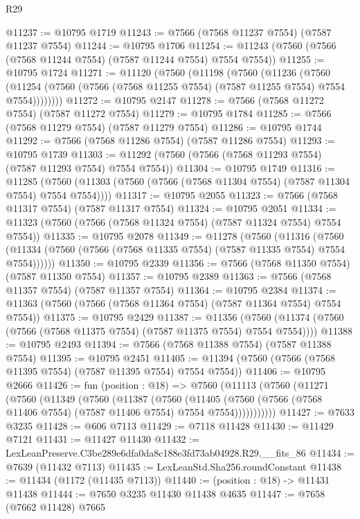 \begin{lexlean}{R29}
\begin{coremodule}
@11237 := @10795 @1719
@11243 := @7566 (@7568 @11237 @7554) (@7587 @11237 @7554)
@11244 := @10795 @1706
@11254 := @11243 (@7560 (@7566 (@7568 @11244 @7554) (@7587 @11244 @7554) @7554 @7554))
@11255 := @10795 @1724
@11271 := @11120
    (@7560
      (@11198
        (@7560
          (@11236
            (@7560
              (@11254 (@7560 (@7566 (@7568 @11255 @7554) (@7587 @11255 @7554) @7554 @7554))))))))
@11272 := @10795 @2147
@11278 := @7566 (@7568 @11272 @7554) (@7587 @11272 @7554)
@11279 := @10795 @1784
@11285 := @7566 (@7568 @11279 @7554) (@7587 @11279 @7554)
@11286 := @10795 @1744
@11292 := @7566 (@7568 @11286 @7554) (@7587 @11286 @7554)
@11293 := @10795 @1739
@11303 := @11292 (@7560 (@7566 (@7568 @11293 @7554) (@7587 @11293 @7554) @7554 @7554))
@11304 := @10795 @1749
@11316 := @11285
    (@7560 (@11303 (@7560 (@7566 (@7568 @11304 @7554) (@7587 @11304 @7554) @7554 @7554))))
@11317 := @10795 @2055
@11323 := @7566 (@7568 @11317 @7554) (@7587 @11317 @7554)
@11324 := @10795 @2051
@11334 := @11323 (@7560 (@7566 (@7568 @11324 @7554) (@7587 @11324 @7554) @7554 @7554))
@11335 := @10795 @2078
@11349 := @11278
    (@7560
      (@11316
        (@7560 (@11334 (@7560 (@7566 (@7568 @11335 @7554) (@7587 @11335 @7554) @7554 @7554))))))
@11350 := @10795 @2339
@11356 := @7566 (@7568 @11350 @7554) (@7587 @11350 @7554)
@11357 := @10795 @2389
@11363 := @7566 (@7568 @11357 @7554) (@7587 @11357 @7554)
@11364 := @10795 @2384
@11374 := @11363 (@7560 (@7566 (@7568 @11364 @7554) (@7587 @11364 @7554) @7554 @7554))
@11375 := @10795 @2429
@11387 := @11356
    (@7560 (@11374 (@7560 (@7566 (@7568 @11375 @7554) (@7587 @11375 @7554) @7554 @7554))))
@11388 := @10795 @2493
@11394 := @7566 (@7568 @11388 @7554) (@7587 @11388 @7554)
@11395 := @10795 @2451
@11405 := @11394 (@7560 (@7566 (@7568 @11395 @7554) (@7587 @11395 @7554) @7554 @7554))
@11406 := @10795 @2666
@11426 := fun (position : @18) =>
  @7560
    (@11113
      (@7560
        (@11271
          (@7560
            (@11349
              (@7560
                (@11387
                  (@7560
                    (@11405
                      (@7560 (@7566 (@7568 @11406 @7554) (@7587 @11406 @7554) @7554 @7554)))))))))))
@11427 := @7633 @3235
@11428 := @606 @7113
@11429 := @7118 @11428
@11430 := @11429 @7121
@11431 := @11427 @11430
@11432 := LexLeanPreserve.C3be289e6dfa0da8c188e3fd73ab04928.R29.__fits_86
@11434 := @7639 (@11432 @7113)
@11435 := LexLeanStd.Sha256.roundConstant
@11438 := @11434 (@1172 (@11435 @7113))
@11440 := (position : @18) -> @11431 @11438
@11444 := @7650 @3235 @11430 @11438 @4635
@11447 := @7658 (@7662 @11428) @7665

\end{coremodule}
\end{lexlean}
